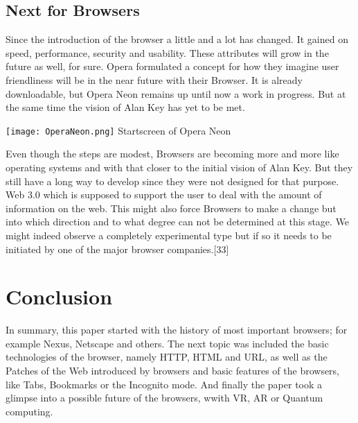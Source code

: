\documentclass[runningheads]{llncs}
\begin{document}
		\subsection{Next for Browsers}
			Since the introduction of the browser a little and a lot has changed. It gained on speed, performance, security and usability. These attributes will grow in the future as well, for sure.
			Opera formulated a concept for how they imagine user friendliness will be in the near future with their Browser. It is already downloadable, but Opera Neon remains up until now a work in progress.
			But at the same time the vision of Alan Key has yet to be met.
		 	\begin{center}
		 		\texttt{[image: OperaNeon.png]}
		 		Startscreen of Opera Neon
		 	\end{center}
		 	
			Even though the steps are modest, Browsers are becoming more and more like operating systems and with that closer to the initial vision of Alan Key. But they still have a long way to develop since they were not designed for that purpose.
			Web 3.0 which is supposed to support the user to deal with the amount of information on the web. This might also force Browsers to make a change but into which direction and to what degree can not be determined at this stage. We might indeed observe a completely experimental type but if so it needs to be initiated by one of the major browser companies.[33]
	\section{Conclusion}
	In summary, this paper started with the history of most important browsers; for example Nexus, Netscape and others. The next topic was included the basic technologies of the browser, namely HTTP, HTML and URL, as well as the Patches of the Web introduced by browsers and basic features of the browsers, like Tabs, Bookmarks or the Incognito mode. And finally the paper took a glimpse into a possible future of the browsers, wwith VR, AR or Quantum computing.
\end{document}
